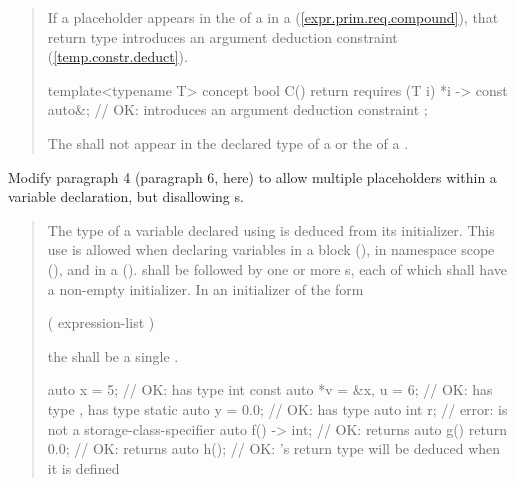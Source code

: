 \begin{quote}
\pnum
If a placeholder appears in the 
of a  in a  
(\ref{expr.prim.req.compound}), that return type introduces an argument 
deduction constraint (\ref{temp.constr.deduct}).
% 
\enterexample
\begin{codeblock}
template<typename T> concept bool C() {
  return requires (T i) { 
    {*i} -> const auto&; // OK: introduces an argument deduction constraint
  };
}
\end{codeblock}
\exitexample

\pnum
The   shall not appear
in the declared type of a  or the
 of a .
\end{quote}


Modify paragraph 4 (paragraph 6, here) to allow multiple placeholders within a 
variable declaration, but disallowing s.

\begin{quote}
\pnum
The type of a variable declared using 
is deduced from its initializer.
% 
This use is allowed when declaring variables in a block (),
in namespace scope (), and in a 
 ().
%
%
   shall be followed by one or more s,
each of which shall have a non-empty initializer.
%
In an initializer of the form
\begin{codeblock}
( expression-list )
\end{codeblock}
the  shall be a single 
.

\enterexample
\begin{codeblock}
auto x = 5;                // OK:  has type int
const auto *v = &x, u = 6; // OK:  has type ,  has type 
static auto y = 0.0;       // OK:  has type 
auto int r;                // error:  is not a storage-class-specifier
auto f() -> int;           // OK:  returns 
auto g() { return 0.0; }   // OK:  returns 
auto h();                  // OK: 's return type will be deduced when it is defined
\end{codeblock}
\exitexample
\end{quote}

